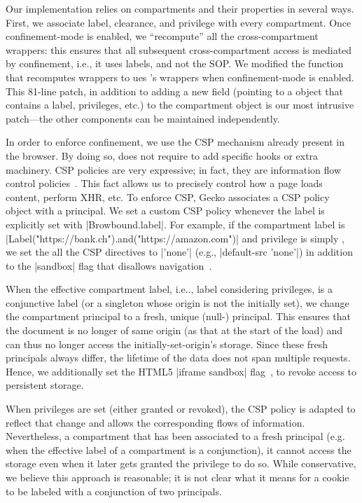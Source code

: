 Our implementation relies on compartments and their properties in
several ways.
%
First, we associate label, clearance, and privilege with every 
compartment.
%
Once confinement-mode is enabled, we ``recompute'' all the
cross-compartment wrappers: this ensures that all subsequent
cross-compartment access is mediated by confinement, i.e., it uses
labels, and not the SOP. %
%
We modified the function that recomputes wrappers to ues \sys{}'s
wrappers when confinement-mode is enabled.
%
This 81-line patch, in addition to adding a new field (pointing to a \sys{}
object that contains a label, privileges, etc.) to the compartment
object is our most intrusive patch---the other \sys{} components can be
maintained independently.
 
%
In order to enforce confinement, we use the CSP mechanism already present 
in the browser. 
By doing so, \sys{} does not require to add specific hooks or extra machinery. 
CSP policies are very expressive; in fact, they are
information flow control policies~\cite{yang:2013:towards}. This fact allows us
to precisely control how a page loads content, perform XHR, etc.
To enforce CSP, Gecko associates a CSP policy object with a principal.
%
We set a custom CSP policy whenever the label is
explicitly set with \js|Browbound.label|.
%
For example, if the compartment label is
\js|Label("https://bank.ch").and("https://amazon.com")| and privilege
is simply , we set the all the CSP directives to
\js|'none'| (e.g., \js|default-src 'none'|) in addition to the
\js|sandbox| flag that disallows
navigation~\cite{csp1.1,whatwg-html,html5}.
%

When the effective compartment label, i.e.., label considering privileges, is
a conjunctive label (or a singleton whose origin is not the initially set), 
we change the compartment principal to a fresh, unique (null-)
principal. 
%
This ensures that the document is no longer of same origin (as that
at the start of the load) and can thus no longer access the
initially-set-origin's storage.
%
Since these fresh principals always differ, the lifetime of the data does not
span multiple requests.
%
Hence, we additionally set the HTML5 \js|iframe sandbox| flag~\cite{html5},
to revoke access to persistent storage.


When privileges are set (either granted or revoked), the CSP policy is adapted
to reflect that change and allows the corresponding flows of
information. Nevertheless, a compartment that has been associated to a fresh
principal (e.g. when the effective label of a compartment is a conjunction), it
 cannot access the storage even when it later gets granted the privilege to
do so. While conservative, we believe this approach is
reasonable; it is not clear what it means for a cookie to be labeled with
a conjunction of two principals. 

